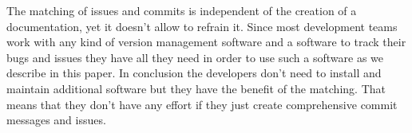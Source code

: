 The matching of issues and commits is independent of the creation of a documentation, yet it doesn't allow to refrain it. Since most development teams work with any kind of version management software and a software to track their bugs and issues they have all they need in order to use such a software as we describe in this paper. In conclusion the developers don't need to install and maintain additional software but they have the benefit of the matching. That means that they don't have any effort if they just create comprehensive commit messages and issues.

